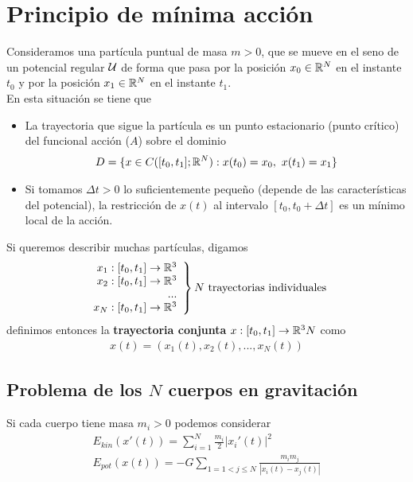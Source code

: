 \section{Principio de mínima acción}

Consideramos una partícula puntual de masa $m>0$, que se mueve en el seno de un potencial regular $\mathcal{U}$ de forma que pasa por la posición $x_0\in \mathbb{R}^N$ en el instante $t_0$ y por la posición $x_1\in \mathbb{R}^N$ en el instante $t_1$. \\

En esta situación se tiene que 
\begin{itemize}
    \item La trayectoria que sigue la partícula es un punto estacionario (punto crítico) del funcional acción ($A$) sobre el dominio
    \begin{gather*}
        D = \{x\in C([t_0, t_1];\mathbb{R}^N) : x(t_0) = x_0,\ x(t_1) = x_1\}
    \end{gather*}

    \item Si tomamos $\Delta t>0$ lo suficientemente pequeño (depende de las características del potencial), la restricción de $x(t)$ al intervalo $[t_0, t_0+\Delta t]$ es un mínimo local de la acción.
\end{itemize}
Si queremos describir muchas partículas, digamos 
\begin{gather*}
    \left.
        \begin{array}{r}
            x_1:[t_0,t_1] \to \mathbb{R}^3\\
            x_2:[t_0,t_1] \to \mathbb{R}^3\\
            ...\\
            x_N:[t_0,t_1] \to \mathbb{R}^3\\
        \end{array}
    \right\} N \text{ trayectorias individuales}
\end{gather*}
definimos entonces la \textbf{trayectoria conjunta} $x:[t_0, t_1]\to \mathbb{R}^3N$ como 
\begin{gather*}
    x(t) = (x_1(t), x_2(t), ..., x_N(t))
\end{gather*}

\subsection{Problema de los $N$ cuerpos en gravitación}

Si cada cuerpo tiene masa $m_i>0$ podemos considerar
\begin{gather*}
    E_{kin}(x'(t)) = \sum_{i=1}^N \frac{m_i}{2} |x_i'(t)|^2\\
    E_{pot}(x(t)) = -G \sum_{1=1<j \leq N} \frac{m_i m_j}{|x_i(t)-x_j(t)|}
\end{gather*}




